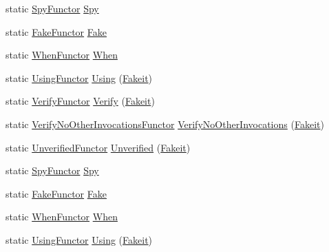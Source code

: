 \begin{DoxyCompactItemize}
\item 
static \mbox{\hyperlink{classfakeit_1_1SpyFunctor}{Spy\+Functor}} \mbox{\hyperlink{namespacefakeit_a540f23d3c59c17f86dd99f0a8d845496}{Spy}}
\item 
static \mbox{\hyperlink{classfakeit_1_1FakeFunctor}{Fake\+Functor}} \mbox{\hyperlink{namespacefakeit_a8162a4e2e05662a6ce810ae0b9a7f89e}{Fake}}
\item 
static \mbox{\hyperlink{classfakeit_1_1WhenFunctor}{When\+Functor}} \mbox{\hyperlink{namespacefakeit_ac9c6dd7971865edcc46e075d6408b1bb}{When}}
\item 
static \mbox{\hyperlink{classfakeit_1_1UsingFunctor}{Using\+Functor}} \mbox{\hyperlink{namespacefakeit_a9455b27545764b3433b1ecc507561870}{Using}} (\mbox{\hyperlink{single__header_2tpunit_2fakeit_8hpp_a2b1f324059bec9d07841630bd5c2e7bc}{Fakeit}})
\item 
static \mbox{\hyperlink{classfakeit_1_1VerifyFunctor}{Verify\+Functor}} \mbox{\hyperlink{namespacefakeit_a98461e1563bebcff90de1ab7871edfef}{Verify}} (\mbox{\hyperlink{single__header_2tpunit_2fakeit_8hpp_a2b1f324059bec9d07841630bd5c2e7bc}{Fakeit}})
\item 
static \mbox{\hyperlink{classfakeit_1_1VerifyNoOtherInvocationsFunctor}{Verify\+No\+Other\+Invocations\+Functor}} \mbox{\hyperlink{namespacefakeit_a1fdaffe6f7ef1789d8ef832cc4cc19c3}{Verify\+No\+Other\+Invocations}} (\mbox{\hyperlink{single__header_2tpunit_2fakeit_8hpp_a2b1f324059bec9d07841630bd5c2e7bc}{Fakeit}})
\item 
static \mbox{\hyperlink{classfakeit_1_1UnverifiedFunctor}{Unverified\+Functor}} \mbox{\hyperlink{namespacefakeit_aeaed1b328c76d8460e403a1a0d22eb96}{Unverified}} (\mbox{\hyperlink{single__header_2tpunit_2fakeit_8hpp_a2b1f324059bec9d07841630bd5c2e7bc}{Fakeit}})
\item 
static \mbox{\hyperlink{classfakeit_1_1SpyFunctor}{Spy\+Functor}} \mbox{\hyperlink{namespacefakeit_a540f23d3c59c17f86dd99f0a8d845496}{Spy}}
\item 
static \mbox{\hyperlink{classfakeit_1_1FakeFunctor}{Fake\+Functor}} \mbox{\hyperlink{namespacefakeit_a8162a4e2e05662a6ce810ae0b9a7f89e}{Fake}}
\item 
static \mbox{\hyperlink{classfakeit_1_1WhenFunctor}{When\+Functor}} \mbox{\hyperlink{namespacefakeit_ac9c6dd7971865edcc46e075d6408b1bb}{When}}
\item 
static \mbox{\hyperlink{classfakeit_1_1UsingFunctor}{Using\+Functor}} \mbox{\hyperlink{namespacefakeit_a9455b27545764b3433b1ecc507561870}{Using}} (\mbox{\hyperlink{single__header_2tpunit_2fakeit_8hpp_a2b1f324059bec9d07841630bd5c2e7bc}{Fakeit}})

\end{DoxyCompactItemize}
